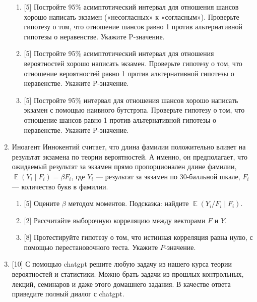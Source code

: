 \documentclass[12pt]{article} %
\DeclareMathOperator{\E}{\mathbb{E}}
\begin{document}
\begin{enumerate}
  \begin{enumerate}
    \item {[5]} Постройте 95\% асимптотический интервал для отношения шансов хорошо написать экзамен («несогласных» к «согласным»).
    Проверьте гипотезу о том, что отношение шансов равно 1 против альтернативной гипотезы о неравенстве. Укажите P-значение.
    \item {[5]} Постройте 95\% асимптотический интервал для отношения вероятностей хорошо написать экзамен. 
    Проверьте гипотезу о том, что отношение вероятностей равно 1 против альтернативной гипотезы о неравенстве. Укажите P-значение.
    \item {[5]} Постройте 95\% интервал для отношения шансов хорошо написать экзамен 
    с помощью наивного бутстрэпа. Проверьте гипотезу о том, что отношение шансов равно 1 против альтернативной гипотезы о неравенстве. Укажите P-значение.
  \end{enumerate}

    \item Иноагент Иннокентий считает, что длина фамилии положительно влияет
    на результат экзамена по теории вероятностей. 
    А именно, он предполагает, что ожидаемый результат за экзамен прямо пропорционален длине фамилии,
    $\E(Y_i \mid F_i) = \beta F_i$, где $Y_i$ — результат за экзамен по 30-балльной шкале,
    $F_i$ — количество букв в фамилии. 

    \begin{enumerate}
      \item {[5]} Оцените $\beta$ методом моментов. Подсказка: найдите $\E(Y_i / F_i \mid F_i)$.
      \item {[2]} Рассчитайте выборочную корреляцию между векторами $F$ и $Y$.
      \item {[8]} Протестируйте гипотезу о том, что истинная корреляция равна нулю, с помощью перестановочного теста. Укажите $P$-значение.
    \end{enumerate}


    \item {[10]} С помощью chatgpt решите любую задачу из нашего курса теории вероятностей и статистики. 
    Можно брать задачи из прошлых контрольных, лекций, семинаров и даже этого домашнего задания.
    В качестве ответа приведите полный диалог с chatgpt. 
 

\end{enumerate}
\end{document}
